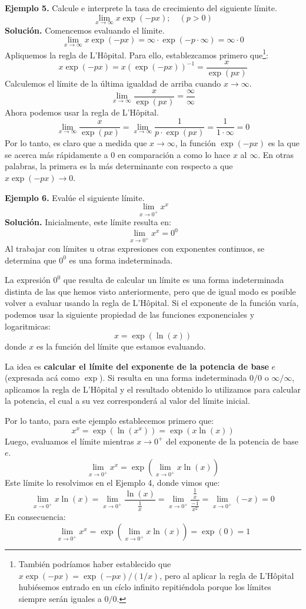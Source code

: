 \documentclass[12pt]{article}
\begin{document}
\textbf{Ejemplo 5.} Calcule e interprete la tasa de crecimiento del siguiente límite.
\[
  \lim_{x \to \infty} x \exp(-px); \quad (p > 0)
\]
\textbf{Solución.} Comencemos evaluando el límite.
\[
  \lim_{x \to \infty} x \exp(-px) = \infty \cdot \exp(-p \cdot \infty) = \infty \cdot 0
\]
Apliquemos la regla de L'Hôpital. Para ello, establezcamos primero que\footnote{También podríamos haber establecido que $x \exp(-px) = \exp(-px)/(1/x)$, pero al aplicar la regla de L'Hôpital hubiésemos entrado en un cíclo infinito repitiéndola porque los límites siempre serán iguales a $0/0$.}:
\[
  x \exp(-px) = x (\exp(-px))^{-1} = \frac{x}{\exp(px)}
\]
Calculemos el límite de la última igualdad de arriba cuando $x \to \infty$.
\[
  \lim_{x \to \infty} \frac{x}{\exp(px)} = \frac{\infty}{\infty}
\]
Ahora podemos usar la regla de L'Hôpital.
\[
  \lim_{x \to \infty} \frac{x}{\exp(px)} = \lim_{x \to \infty} \frac{1}{p \cdot \exp(px)} = \frac{1}{1 \cdot \infty} = 0
\]
Por lo tanto, es claro que a medida que $x \to \infty$, la función $\exp(-px)$ es la que se acerca más rápidamente a $0$ en comparación a como lo hace $x$ al $\infty$. En otras palabras, la primera es la más determinante con respecto a que $x \exp(-px) \to 0$.

\textbf{Ejemplo 6.} Evalúe el siguiente límite.
\[
  \lim_{x \to 0^{+}} x^{x}
\]
\textbf{Solución.} Inicialmente, este límite resulta en:
\[
  \lim_{x \to 0^{+}} x^{x} = 0^{0}
\]
Al trabajar con límites u otras expresiones con exponentes continuos, se determina que $0^{0}$ es una forma indeterminada.

La expresión $0^{0}$ que resulta de calcular un límite es una forma indeterminada distinta de las que hemos visto anteriormente, pero que de igual modo es posible volver a evaluar usando la regla de L'Hôpital. Si el exponente de la función varía, podemos usar la siguiente propiedad de las funciones exponenciales y logaritmicas:
\[
  x = \exp(\ln(x))
\]
donde $x$ es la función del límite que estamos evaluando.

La idea es \textbf{calcular el límite del exponente de la potencia de base} $e$ (expresada acá como $\exp$). Si resulta en una forma indeterminada $0/0$ o $\infty/\infty$, aplicamos la regla de L'Hôpital y el resultado obtenido lo utilizamos para calcular la potencia, el cual a su vez corresponderá al valor del límite inicial.

Por lo tanto, para este ejemplo establecemos primero que:
\[
  x^{x} = \exp(\ln(x^{x})) = \exp(x \ln(x))
\]
Luego, evaluamos el límite mientras $x \to 0^{+}$ del exponente de la potencia de base $e$.
\[
  \lim_{x \to 0^{+}} x^{x} = \exp\left(\lim_{x \to 0^{+}} x \ln(x)\right)
\]
Este límite lo resolvimos en el Ejemplo 4, donde vimos que:
\[
  \lim_{x \to 0^{+}} x \ln(x) = \lim_{x \to 0^{+}} \frac{\ln(x)}{\displaystyle \frac{1}{x}}
                              = \lim_{x \to 0^{+}} \frac{\displaystyle \frac{1}{x}}{\displaystyle \frac{-1}{x^{2}}}
                              = \lim_{x \to 0^{+}} (-x)
                              = 0
\]
En consecuencia:
\[
  \lim_{x \to 0^{+}} x^{x} = \exp\left(\lim_{x \to 0^{+}} x \ln(x)\right) = \exp(0) = 1
\]
\end{document}
